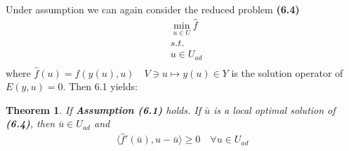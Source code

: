 \documentclass[a4paper,11pt,fleqn]{book}
\newtheorem{theorem}{Theorem}[section]
\theoremstyle{definition}
\theoremstyle{remark}
\begin{document}
Under assumption we can again consider the reduced problem \textbf{(6.4)}
\begin{align*}
	&\min_{u \in U} \hat{f} \\
	&s.t. \\
	&u \in U_{ad}\\
\end{align*}
where $\hat{f}(u) = f(y(u), u) \quad V \ni u \mapsto y(u) \in Y$ is the solution operator of $E(y, u) = 0$. Then 6.1 yields:

\begin{theorem}
	If \textbf{Assumption (6.1)} holds. If $\bar{u}$ is a local optimal solution of \textbf{(6.4)}, then $\bar{u} \in U_{ad}$ and 
	\begin{align*}
		\langle \hat{f}'(\bar{u}), u - \bar{u} \rangle \geq 0 \quad 
		\forall u \in U_{ad}
	\end{align*}
\end{theorem}
\end{document}
